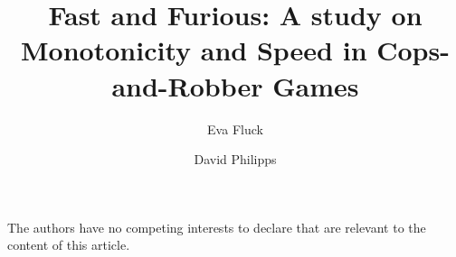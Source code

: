 \documentclass[runningheads,envcountsame]{llncs}
\begin{document}
\title{Fast and Furious: A study on Monotonicity and Speed in Cops-and-Robber Games}


\author{Eva Fluck \and David Philipps}



\maketitle             











\begin{credits}
\subsubsection{\discintname}
The authors have no competing interests to declare that are
relevant to the content of this article.
\end{credits}




\newpage
\appendix


\end{document}
